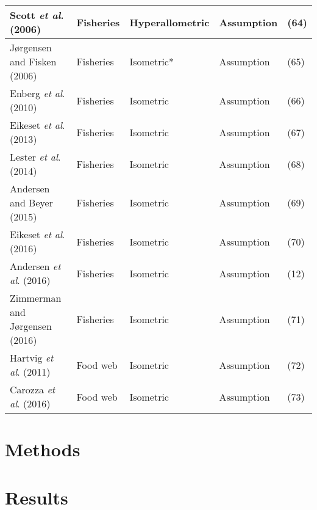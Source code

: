 \documentclass[a4paper]{article} %
\begin{document}
\begin{table}[]
\begin{tabular}{|l|l|l|l|l|}
        Scott \textit{et al}. (2006)            & Fisheries           & Hyperallometric  & Assumption                        & (64)          \\ \hline
        Jørgensen and Fisken (2006)             & Fisheries           & Isometric*       & Assumption                        & (65)          \\ \hline
        Enberg \textit{et al}. (2010)           & Fisheries           & Isometric        & Assumption                        & (66)          \\ \hline
        Eikeset \textit{et al}. (2013)          & Fisheries           & Isometric        & Assumption                        & (67)          \\ \hline
        Lester \textit{et al}. (2014)           & Fisheries           & Isometric        & Assumption                        & (68)          \\ \hline
        Andersen and Beyer (2015)               & Fisheries           & Isometric        & Assumption                        & (69)          \\ \hline
        Eikeset \textit{et al}. (2016)          & Fisheries           & Isometric        & Assumption                        & (70)          \\ \hline
        Andersen \textit{et al}. (2016)         & Fisheries           & Isometric        & Assumption                        & (12)          \\ \hline
        Zimmerman and Jørgensen (2016)          & Fisheries           & Isometric        & Assumption                        & (71)          \\ \hline
        Hartvig \textit{et al}. (2011)          & Food web            & Isometric        & Assumption                        & (72)          \\ \hline
        Carozza \textit{et al}. (2016)          & Food web            & Isometric        & Assumption                        & (73)          \\ \hline
        \end{tabular}
    \end{table}
\section{Methods}\thispagestyle{empty}
\lipsum

\section{Results}\thispagestyle{empty}
\lipsum
\end{document}
